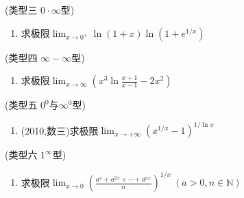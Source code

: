 \documentclass[12pt, a4paper, oneside, UTF8]{ctexbook}
\begin{document}
\begin{remark}(类型三 $0\cdot\infty$型)
\end{remark}

\begin{enumerate}[label=\arabic*.,start=7]
    \item  求极限$\lim_{x\to0^+}\ln(1+x)\ln\left(1+e^{1/x}\right)$
    
    \begin{solution}
    
    \end{solution}
\end{enumerate}

\begin{remark}(类型四 $\infty-\infty$型)
\end{remark}

\begin{enumerate}[label=\arabic*.,start=8]
    \item  求极限$\lim_{x\to\infty}\left(x^3\ln\frac{x+1}{x-1}-2x^2\right)$
    
    \begin{solution}
    \newpage
    \end{solution}
\end{enumerate}

\begin{remark}(类型五 $0^0$与$\infty^0$型)
\end{remark}

\begin{enumerate}[label=\arabic*.,start=9]
    \item  (2010,数三)求极限$\lim_{x\to+\infty}\left(x^{1/x}-1\right)^{1/\ln x}$
    
    \begin{solution}
    \newpage
    \end{solution}
\end{enumerate}

\begin{remark}(类型六 $1^\infty$型)
\end{remark}

\begin{enumerate}[label=\arabic*.,start=10]
    \item  求极限$\lim_{x\to0}\left(\frac{a^x+a^{2x}+\cdots+a^{nx}}{n}\right)^{1/x}\ (a>0,n\in\mathbb{N})$
    
    \begin{solution}
    
    \end{solution}
\end{enumerate}
\end{document}

